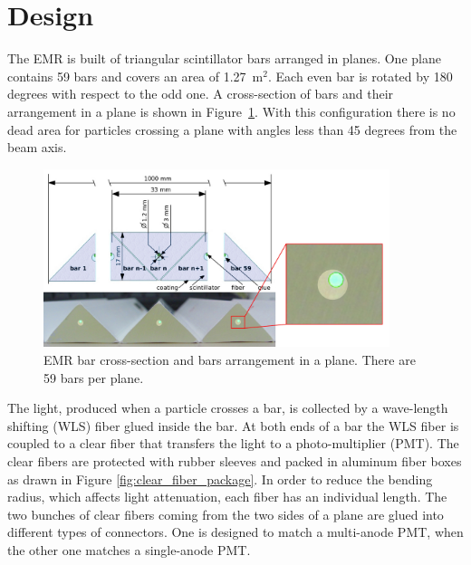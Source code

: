 \documentclass[a4paper,11pt]{article}
\begin{document}
\section{Design}
The EMR is built of triangular scintillator bars arranged in planes. 
One plane contains 59 bars and covers an area of 1.27~m$^2$. Each even bar is rotated by 180 degrees with respect to the odd one.
A cross-section of bars and their arrangement in a plane is shown in Figure~\ref{fig:bar_arrangement_in_a_plane}. With this
configuration there is no dead area for particles crossing a plane with angles less than 45 degrees from the beam axis.

\begin{figure}[htp!]
 \centering
 \includegraphics[width=0.9\textwidth]{./bar_arrangement_in_a_plane}
 \caption[EMR bar cross-section and plane arrangement]{EMR bar cross-section and bars arrangement in a plane. There are 59 bars per plane.}
 \label{fig:bar_arrangement_in_a_plane}
\end{figure}


The light, produced when a particle crosses a bar, is collected by a wave-length shifting (WLS) fiber glued inside the bar. 
At both ends of a bar the WLS fiber is coupled to a clear fiber that transfers the light to a photo-multiplier
(PMT). The clear fibers are protected with rubber sleeves and packed in aluminum fiber boxes as drawn in Figure 
\ref{fig:clear_fiber_package}. In order to reduce the bending radius, which affects light attenuation, each fiber has an individual
length. The two bunches of clear fibers coming from the two sides of a plane are glued into different types of connectors.
One is designed to match a multi-anode PMT, when the other one matches a single-anode PMT.
\end{document}
